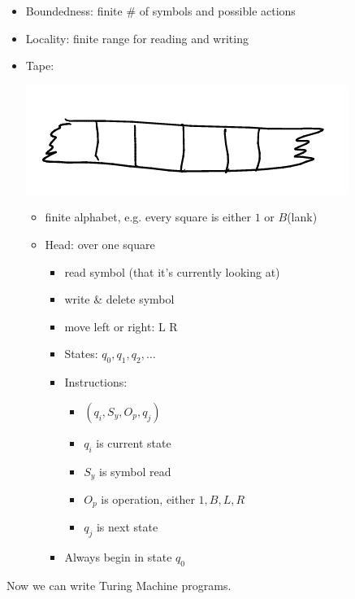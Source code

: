 \documentclass[11pt]{article}
\begin{document}
\begin{itemize}
\item Boundedness: finite \# of symbols and possible actions
\item Locality: finite range for reading and writing
\item Tape: \begin{center}
\includegraphics[width=.9\linewidth]{./Images/i23.png}
\end{center}
\begin{itemize}
\item finite alphabet, e.g. every square is either \(1\) or \(B\)(lank)
\item Head: over one square
\begin{itemize}
\item read symbol (that it's currently looking at)
\item write \& delete symbol
\item move left or right: L R
\item States: \(q_0, q_1, q_2,\ldots\)
\item Instructions:
\begin{itemize}
\item \((q_i,S_y,O_p,q_j)\)
\item \(q_i\) is current state
\item \(S_y\) is symbol read
\item \(O_p\) is operation, either \(1,B,L,R\)
\item \(q_j\) is next state
\end{itemize}
\item Always begin in state \(q_0\)
\end{itemize}
\end{itemize}
\end{itemize}
Now we can write Turing Machine programs.
\end{document}
